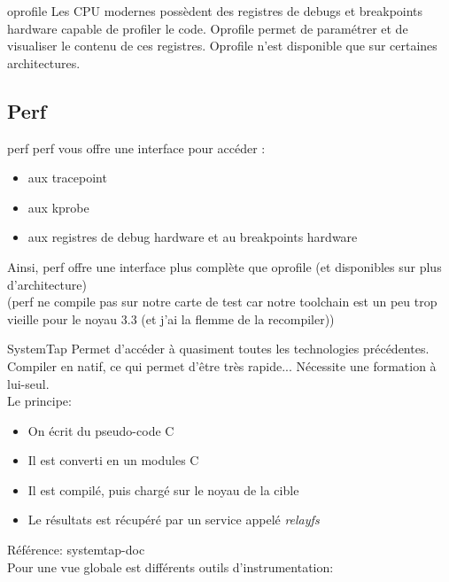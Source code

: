 \begin{frame}[fragile=singleslide]{oprofile}
  Les CPU  modernes possèdent des  registres de debugs  et breakpoints
  hardware capable de profiler  le code. Oprofile permet de paramétrer
  et  de  visualiser le  contenu  de  ces  registres.  Oprofile  n'est
  disponible que sur certaines architectures.
\end{frame} 

\subsection{Perf}

\begin{frame}[fragile=singleslide]{perf}
  perf vous offre une interface pour accéder :
  \begin{itemize} 
  \item  aux tracepoint
  \item  aux kprobe
  \item  aux registres de debug hardware et au breakpoints hardware
  \end{itemize} 
  Ainsi,  perf offre  une  interface plus  complète  que oprofile  (et
  disponibles sur plus d'architecture)
  \\[2ex]
  (perf ne compile pas sur notre carte de test  car notre toolchain est un peu trop
  vieille pour le noyau 3.3 (et j'ai la flemme de la recompiler))
\end{frame} 

\begin{frame}[fragile=singleslide]{SystemTap}
  Permet    d'accéder   à    quasiment   toutes    les   technologies
  précédentes.  Compiler  en  natif,   ce  qui  permet  d'être  très
  rapide... Nécessite une formation à lui-seul.
  \\[2ex]
  Le principe:
  \begin{itemize} 
  \item  On écrit du pseudo-code C
  \item  Il est converti en un modules C
  \item  Il est compilé, puis chargé sur le noyau de la cible
  \item  Le résultats est récupéré par un service appelé \emph{relayfs}
  \end{itemize} 
  Référence: systemtap-doc
  \\[2ex]
  Pour   une   vue  globale   est   différents   outils  d'instrumentation:
\end{frame} 






